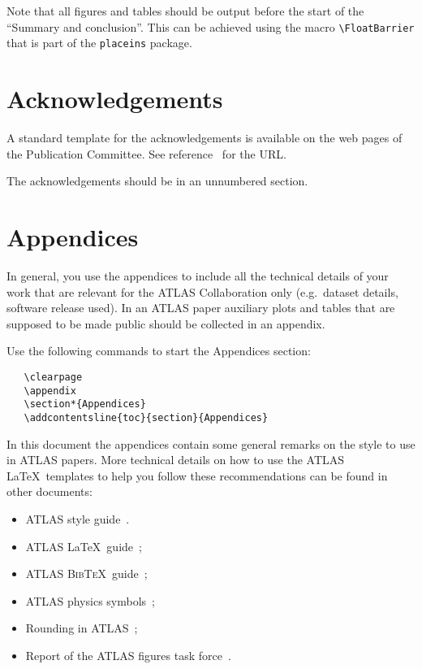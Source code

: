 \documentclass[UKenglish]{latex/atlasdoc}
\newcommand{\BibTeX}{\textsc{Bib\TeX}}
\newcommand{\Macro}[1]{\texttt{\textbackslash #1}\xspace}
\newcommand{\Package}[1]{\texttt{#1}\xspace}
\begin{document}
Note that all figures and tables should be output before the start of the
\enquote{Summary and conclusion}.
This can be achieved using the macro \Macro{FloatBarrier} that is part of the 
\Package{placeins} package.


\section*{Acknowledgements}
\label{sec:acknowldge}

A standard template for the acknowledgements is available on the
web pages of the Publication Committee.
See reference~\cite{publication-policy} for the URL. 

The acknowledgements should be in an unnumbered section.


\clearpage
\appendix
\section*{Appendices}

In general, you use the appendices to include all the technical details of your work
that are relevant for the ATLAS Collaboration only (e.g.\ dataset details, software release used).
In an ATLAS paper auxiliary plots and tables that are supposed to be made public 
should be collected in an appendix.

Use the following commands to start the Appendices section:
\begin{verbatim}
   \clearpage
   \appendix
   \section*{Appendices}
   \addcontentsline{toc}{section}{Appendices}
\end{verbatim}

In this document the appendices contain some general remarks on the style to use in ATLAS papers.
More technical details on how to use the ATLAS \LaTeX\ templates to help you follow 
these recommendations can be found in other documents:
\begin{itemize}
\item ATLAS style guide~\cite{atlas-style}.
\item ATLAS \LaTeX\ guide~\cite{atlas-latex};
\item ATLAS \BibTeX\ guide~\cite{atlas-bibtex};
\item ATLAS physics symbols~\cite{atlas-physics};
\item Rounding in ATLAS~\cite{atlas-rounding};
\item Report of the ATLAS figures task force~\cite{atlas-figures}.
\end{itemize}
\end{document}
